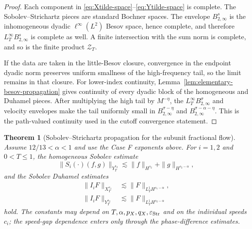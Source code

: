 \documentclass[10pt]{amsart}
\numberwithin{equation}{section}
\theoremstyle{plain}
\newtheorem{theorem}{Theorem}[section]
\theoremstyle{definition}
\theoremstyle{remark}
\newcommand{\eps}{\varepsilon}
\begin{document}
\begin{proof}
Each component in \eqref{eq:Xtilde-space}--\eqref{eq:Ytilde-space} is complete.  The Sobolev--Strichartz pieces are standard Bochner spaces.  The envelope $B_{2,\infty}^s$ is the inhomogeneous dyadic $\ell^\infty(L^2)$ Besov space, hence complete, and therefore $L_T^\infty B_{2,\infty}^s$ is complete as well.  A finite intersection with the sum norm is complete, and so is the finite product $\mathcal Z_T$.

If the data are taken in the little-Besov closure, convergence in the endpoint dyadic norm preserves uniform smallness of the high-frequency tail, so the limit remains in that closure.  For lower-index continuity, Lemma~\ref{lem:elementary-besov-propagation} gives continuity of every dyadic block of the homogeneous and Duhamel pieces.  After multiplying the high tail by $M^{-\eta}$, the $L_T^\infty B_{2,\infty}^{\sigma}$ and velocity envelopes make the tail uniformly small in $B_{2,\infty}^{\sigma-\eta}$ and $B_{2,\infty}^{\sigma-\alpha-\eta}$.  This is the path-valued continuity used in the cutoff convergence statement.
\end{proof}



\begin{theorem}[Sobolev--Strichartz propagation for the subunit fractional flow]\label{prop:strichartz}
Assume $12/13<\alpha<1$ and use the Case F exponents above.  For $i=1,2$ and $0<T\le1$, the homogeneous Sobolev estimate
\begin{equation}
 \|S_i(\cdot)(f,g)\|_{Y_T^{s_2}}
 \lesssim \|f\|_{H^{s_2}}+\|g\|_{H^{s_2-\alpha}},
 \label{eq:homogeneous-Y-estimate}
\end{equation}
and the Sobolev Duhamel estimates
\begin{align}
 \|I_iF\|_{X_T^{s_1}}&\lesssim \|F\|_{L_T^1H^{s_1-\alpha}},
 \label{eq:strichartz-input-X}\\
 \|I_iF\|_{Y_T^{s_2}}&\lesssim \|F\|_{L_T^1H^{s_2-\alpha}}
 \label{eq:strichartz-input-Y}
\end{align}
hold.  The constants may depend on $T,\alpha,p_X,q_X,\eps_{\rm Str}$ and on the individual speeds $c_i$; the speed-gap dependence enters only through the phase-difference estimates.
\end{theorem}
\end{document}
